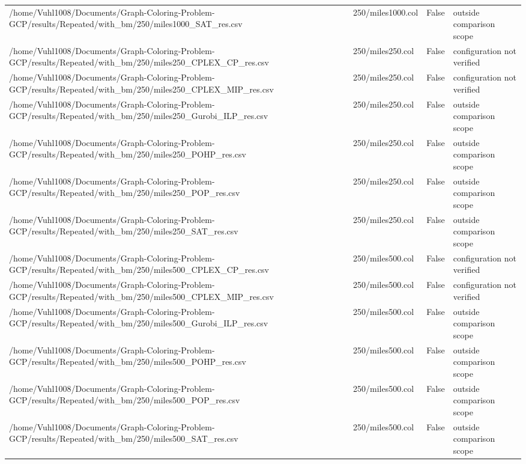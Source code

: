 \begin{table}[htbp]
\begin{tabular}{llll}
/home/Vuhl1008/Documents/Graph-Coloring-Problem-GCP/results/Repeated/with\_bm/250/miles1000\_SAT\_res.csv & 250/miles1000.col & False & outside comparison scope \\
/home/Vuhl1008/Documents/Graph-Coloring-Problem-GCP/results/Repeated/with\_bm/250/miles250\_CPLEX\_CP\_res.csv & 250/miles250.col & False & configuration not verified \\
/home/Vuhl1008/Documents/Graph-Coloring-Problem-GCP/results/Repeated/with\_bm/250/miles250\_CPLEX\_MIP\_res.csv & 250/miles250.col & False & configuration not verified \\
/home/Vuhl1008/Documents/Graph-Coloring-Problem-GCP/results/Repeated/with\_bm/250/miles250\_Gurobi\_ILP\_res.csv & 250/miles250.col & False & outside comparison scope \\
/home/Vuhl1008/Documents/Graph-Coloring-Problem-GCP/results/Repeated/with\_bm/250/miles250\_POHP\_res.csv & 250/miles250.col & False & outside comparison scope \\
/home/Vuhl1008/Documents/Graph-Coloring-Problem-GCP/results/Repeated/with\_bm/250/miles250\_POP\_res.csv & 250/miles250.col & False & outside comparison scope \\
/home/Vuhl1008/Documents/Graph-Coloring-Problem-GCP/results/Repeated/with\_bm/250/miles250\_SAT\_res.csv & 250/miles250.col & False & outside comparison scope \\
/home/Vuhl1008/Documents/Graph-Coloring-Problem-GCP/results/Repeated/with\_bm/250/miles500\_CPLEX\_CP\_res.csv & 250/miles500.col & False & configuration not verified \\
/home/Vuhl1008/Documents/Graph-Coloring-Problem-GCP/results/Repeated/with\_bm/250/miles500\_CPLEX\_MIP\_res.csv & 250/miles500.col & False & configuration not verified \\
/home/Vuhl1008/Documents/Graph-Coloring-Problem-GCP/results/Repeated/with\_bm/250/miles500\_Gurobi\_ILP\_res.csv & 250/miles500.col & False & outside comparison scope \\
/home/Vuhl1008/Documents/Graph-Coloring-Problem-GCP/results/Repeated/with\_bm/250/miles500\_POHP\_res.csv & 250/miles500.col & False & outside comparison scope \\
/home/Vuhl1008/Documents/Graph-Coloring-Problem-GCP/results/Repeated/with\_bm/250/miles500\_POP\_res.csv & 250/miles500.col & False & outside comparison scope \\
/home/Vuhl1008/Documents/Graph-Coloring-Problem-GCP/results/Repeated/with\_bm/250/miles500\_SAT\_res.csv & 250/miles500.col & False & outside comparison scope \\

\end{tabular}
\end{table}

